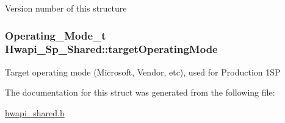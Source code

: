 Version number of this structure \hypertarget{structHwapi__1Sp__Shared_afb76ddf0c514be3d6528ff5b24dbbe33}{
\subsubsection[{target\-Operating\-Mode}]{\setlength{\rightskip}{0pt plus 5cm}Operating\-\_\-\-Mode\-\_\-t Hwapi\-\_\-Sp\-\_\-\-Shared\-::target\-Operating\-Mode}}\label{structHwapi__1Sp__Shared_afb76ddf0c514be3d6528ff5b24dbbe33}
Target operating mode (Microsoft, Vendor, etc), used for Production 1\-S\-P 

The documentation for this struct was generated from the following file\-:\begin{DoxyCompactItemize}
\item 
\hyperlink{hwapi__shared_8h}{hwapi\-\_\-shared.\-h}\end{DoxyCompactItemize}
